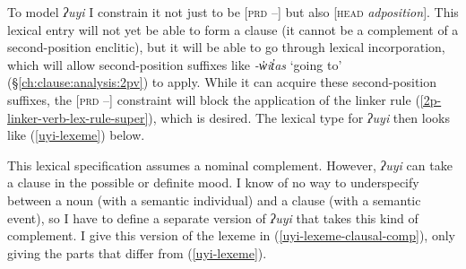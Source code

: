 To model \textit{ʔuyi} I constrain it not just to be [\textsc{prd} --] but also [\textsc{head} \textit{adposition}]. This lexical entry will not yet be able to form a clause (it cannot be a complement of a second-position enclitic), but it will be able to go through lexical incorporation, which will allow second-position suffixes like \textit{-w̓it̓as} `going to' (\S\ref{ch:clause:analysis:2pv}) to apply. While it can acquire these second-position suffixes, the [\textsc{prd} --] constraint will block the application of the linker rule (\ref{2p-linker-verb-lex-rule-super}), which is desired. The lexical type for \textit{ʔuyi} then looks like (\ref{uyi-lexeme}) below.

\begin{singlespacing}
\ex \label{uyi-lexeme}
\xe
\end{singlespacing}

This lexical specification assumes a nominal complement. However, \textit{ʔuyi} can take a clause in the possible or definite mood. I know of no way to underspecify between a noun (with a semantic individual) and a clause (with a semantic event), so I have to define a separate version of \textit{ʔuyi} that takes this kind of complement. I give this version of the lexeme in (\ref{uyi-lexeme-clausal-comp}), only giving the parts that differ from (\ref{uyi-lexeme}).

